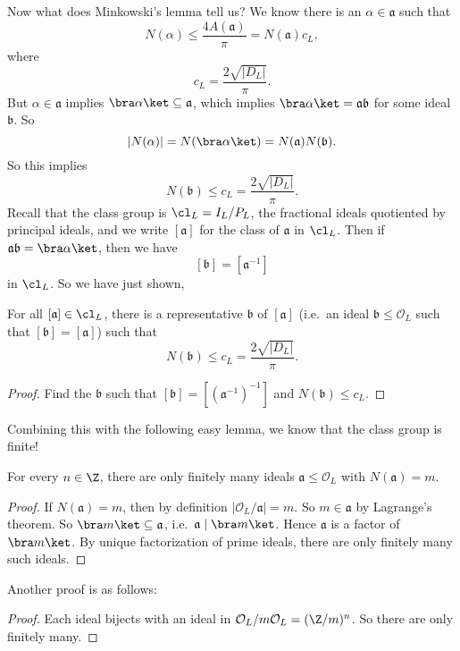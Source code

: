 \documentclass[a4paper]{article}
\begin{document}
Now what does Minkowski's lemma tell us? We know there is an $\alpha \in \mathfrak{a}$ such that
\[
  N(\alpha) \leq \frac{4A(\mathfrak{a})}{\pi} = N(\mathfrak{a}) c_L,
\]
where
\[
  c_L = \frac{2\sqrt{|D_L|}}{\pi}.
\]
But $\alpha \in \mathfrak{a}$ implies $\bra \alpha\ket \subseteq \mathfrak{a}$, which implies $\bra \alpha\ket = \mathfrak{a} \mathfrak{b}$ for some ideal $\mathfrak{b}$. So
\[
  |N(\alpha)| = N(\bra \alpha\ket) = N(\mathfrak{a})N(\mathfrak{b}).
\]
So this implies
\[
  N(\mathfrak{b}) \leq c_L = \frac{2\sqrt{|D_L|}}{\pi}.
\]
Recall that the class group is $\cl_L = I_L/P_L$, the fractional ideals quotiented by principal ideals, and we write $[\mathfrak{a}]$ for the class of $\mathfrak{a}$ in $\cl_L$. Then if $\mathfrak{a}\mathfrak{b} = \bra \alpha\ket$, then we have
\[
  [\mathfrak{b}] = [\mathfrak{a}^{-1}]
\]
in $\cl_L$. So we have just shown,
\begin{prop}
  For all $[\mathfrak{a}] \in \cl_L$, there is a representative $\mathfrak{b}$ of $[\mathfrak{a}]$ (i.e.\ an ideal $\mathfrak{b} \leq \mathcal{O}_L$ such that $[\mathfrak{b}] = [\mathfrak{a}]$) such that
  \[
    N(\mathfrak{b}) \leq c_L = \frac{2\sqrt{|D_L|}}{\pi}.
  \]
\end{prop}

\begin{proof}
  Find the $\mathfrak{b}$ such that $[\mathfrak{b}] = [(\mathfrak{a}^{-1})^{-1}]$ and $N(\mathfrak{b}) \leq c_L$.
\end{proof}

Combining this with the following easy lemma, we know that the class group is finite!
\begin{lemma}
  For every $n \in \Z$, there are only finitely many ideals $\mathfrak{a} \leq \mathcal{O}_L$ with $N(\mathfrak{a}) = m$.
\end{lemma}

\begin{proof}
  If $N(\mathfrak{a}) = m$, then by definition $|\mathcal{O}_L/\mathfrak{a}| = m$. So $m \in \mathfrak{a}$ by Lagrange's theorem. So $\bra m \ket \subseteq \mathfrak{a}$, i.e.\ $\mathfrak{a} \mid \bra m\ket$. Hence $\mathfrak{a}$ is a factor of $\bra m\ket$. By unique factorization of prime ideals, there are only finitely many such ideals.
\end{proof}

Another proof is as follows:
\begin{proof}
  Each ideal bijects with an ideal in $\mathcal{O}_L/m\mathcal{O}_L = (\Z/m)^n$. So there are only finitely many.
\end{proof}
\end{document}
